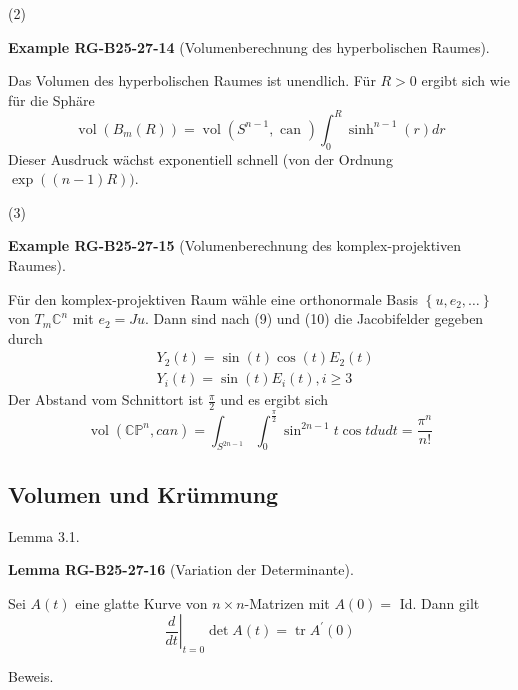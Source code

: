 \documentclass[10pt, letterpaper]{article}
\newcommand{\CustomHeading}[3]{%
  \par\medskip\noindent%
  \textbf{#1 #2} \textnormal{(#3)}.\enskip%
}
\newenvironment{LEM}[2]{\begin{unitbox}\CustomHeading{Lemma}{#1}{#2}}{\end{unitbox}}
\newenvironment{EXA}[2]{\begin{unitbox}\CustomHeading{Example}{#1}{#2}}{\end{unitbox}}
\begin{document}
(2) 


\begin{EXA}{RG-B25-27-14}{Volumenberechnung des hyperbolischen Raumes}
Das Volumen des hyperbolischen Raumes ist unendlich. Für $R>0$ ergibt sich wie für die Sphäre
$$
\operatorname{vol}\left(B_{m}(R)\right)=\operatorname{vol}\left(S^{n-1}, \text { can }\right) \int_{0}^{R} \sinh ^{n-1}(r) d r
$$
Dieser Ausdruck wächst exponentiell schnell (von der Ordnung $\exp ((n-1) R))$.
\end{EXA}



(3) 


\begin{EXA}{RG-B25-27-15}{Volumenberechnung des komplex-projektiven Raumes}
Für den komplex-projektiven Raum wähle eine orthonormale Basis $\left\{u, e_{2}, \ldots\right\}$ von $T_{m} \mathbb{C}^{n}$ mit $e_{2}=J u$. Dann sind nach (9) und (10) die Jacobifelder gegeben durch
$$
\begin{aligned}
& Y_{2}(t)=\sin (t) \cos (t) E_{2}(t) \\
& Y_{i}(t)=\sin (t) E_{i}(t), i \geq 3
\end{aligned}
$$
Der Abstand vom Schnittort ist $\frac{\pi}{2}$ und es ergibt sich
$$
\operatorname{vol}\left(\mathbb{C P}^{n}, c a n\right)=\int_{S^{2 n-1}} \int_{0}^{\frac{\pi}{2}} \sin ^{2 n-1} t \cos t d u d t=\frac{\pi^{n}}{n!}
$$
\end{EXA}




\pagebreak


\subsection{Volumen und Krümmung}


Lemma 3.1. 



\begin{LEM}{RG-B25-27-16}{Variation der Determinante}
Sei $A(t)$ eine glatte Kurve von $n \times n$-Matrizen mit $A(0)=$ Id. Dann gilt
$$
\left.\frac{d}{d t}\right|_{t=0} \operatorname{det} A(t)=\operatorname{tr} A^{\prime}(0)
$$
\end{LEM}


Beweis. 
\end{document}
